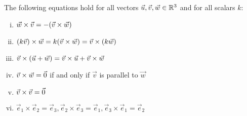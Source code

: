 \documentclass[a4paper,8pt]{article}
\begin{document}
\begin{outline}
    The following equations hold for all vectors \(\vec{u}, \vec{v}, \vec{w} \in \mathbb{R}^3\) and for all scalars \(k\):
    \begin{enumerate}[i.]
      \item \(\vec{w}\times\vec{v} = -(\vec{v}\times\vec{w})\)
      \item \((k\vec{v})\times\vec{w} = k(\vec{v}\times\vec{w}) = \vec{v}\times(k\vec{w})\)
      \item \(\vec{v}\times(\vec{u}+\vec{w})=\vec{v}\times\vec{u}+\vec{v}\times\vec{w}\)
      \item \(\vec{v}\times\vec{w}=\vec{0}\) if and only if \(\vec{v}\) is parallel to \(\vec{w}\)
      \item \(\vec{v}\times\vec{v} = \vec{0}\)
      \item \(\vec{e}_1\times\vec{e}_2=\vec{e}_3,\vec{e}_2\times\vec{e}_3=\vec{e}_1,\vec{e}_3\times\vec{e}_1=\vec{e}_2\)
    \end{enumerate}

\end{outline}
\end{document}
